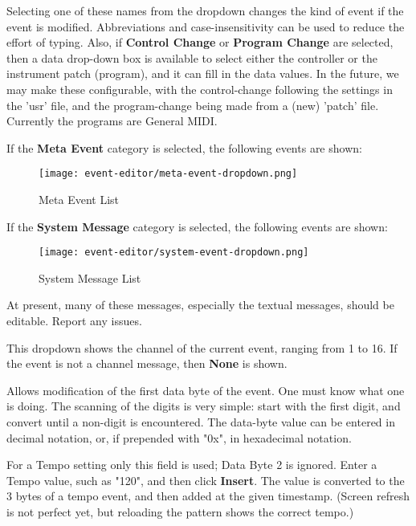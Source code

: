    Selecting one of these names from the dropdown changes the kind of event if
   the event is modified.  Abbreviations and case-insensitivity can be used to
   reduce the effort of typing.
   Also, if \textbf{Control Change} or
   \textbf{Program Change} are selected, then a data drop-down box is available
   to select either the controller or
   the instrument patch (program), and it can fill in the data values.
   In the future, we may make these configurable, with the control-change
   following the settings in the 'usr' file, and the program-change being made
   from a (new) 'patch' file. Currently the programs are General MIDI.

   If the \textbf{Meta Event} category is selected, the following events are
   shown:

\begin{figure}[H]
   \centering
   \texttt{[image: event-editor/meta-event-dropdown.png]}
   \caption{Meta Event List}
   \label{fig:event_editor_meta_dropdown}
\end{figure}

   If the \textbf{System Message} category is selected, the following events are
   shown:

\begin{figure}[H]
   \centering
   \texttt{[image: event-editor/system-event-dropdown.png]}
   \caption{System Message List}
   \label{fig:event_editor_system_dropdown}
\end{figure}

   At present, many of these messages, especially the textual messages,
   should be editable.
   Report any issues.

   This dropdown shows the channel of the current event, ranging from 1 to 16.
   If the event is not a channel message, then \textbf{None} is shown.

   Allows modification of the first data byte of the event.
   One must know what one is doing.
   The scanning of the digits is very simple:  start with the first digit, and
   convert until a non-digit is encountered.  The data-byte value can be
   entered in decimal notation, or, if prepended with "0x", in hexadecimal
   notation.

   For a Tempo setting only this field is used; Data Byte 2 is ignored.
   Enter a Tempo value, such as "120", and then click \textbf{Insert}. The
   value is converted to the 3 bytes of a tempo event, and then
   added at the given timestamp.  (Screen refresh is not perfect yet, but
   reloading the pattern shows the correct tempo.)

